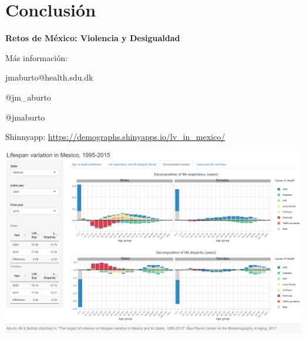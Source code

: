 \documentclass[xcolor={dvipsnames}]{beamer}
\begin{document}

\section{Conclusi\'on}
\begin{frame}
 \begin{center}
	\begin{center}
	\huge{ \textbf{Retos de M\'exico: Violencia y Desigualdad}}
	\end{center}
	
	\bigskip
	\bigskip
M\'as informaci\'on:

jmaburto@health.sdu.dk 

\faTwitter \quad  @jm\_aburto 

\faGithub \quad @jmaburto 

Shinnyapp: \url{https://demographs.shinyapps.io/lv_in_mexico/}


\includegraphics[scale=0.1]{Figures/Shinnyapp_fig} \\   

 

\end{center}
 
 

\end{frame}
\end{document}
